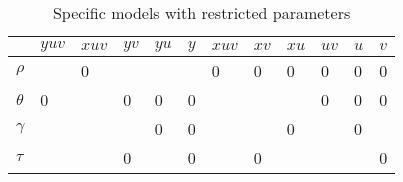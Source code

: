 \begin{table}[htbp]
	
	\centering
	
	\caption{Specific  models with restricted parameters}
	
	\label{Tab01}
	\begin{tabular}{@{}llllllllllll@{}}
		\toprule
		 & $yuv$ & $xuv$ & $yv$ & $yu$ & $y$ & $xuv$ & $xv$ & $xu$ & $uv$ & $u$ & $v$  \\ \midrule
		$\rho$   &     & 0   &    &    &   & 0   & 0  & 0  & 0  & 0 & 0 \\
		$\theta$ & 0   &     & 0  & 0  & 0 &     &    &    & 0  & 0 & 0 \\
		$\gamma$ &     &     &    & 0  & 0 &     &    & 0  &    & 0 &   \\
		$\tau$   &     &     & 0  &    & 0 &     & 0  &    &    &   & 0 \\ \bottomrule
	\end{tabular}
\end{table}



\endinput
